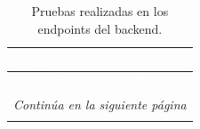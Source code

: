\begin{longtable}{|p{5cm}|p{9cm}|}
    \caption{Pruebas realizadas en los endpoints del backend.} \label{tab:pruebas_route_handlers}                                                    \\

    \hline
    \rowcolor[HTML]{E6B8CE}
    \textbf{\textcolor{white}{Endpoint}}                  & \textbf{\textcolor{white}{Test}}                                                         \\ \hline
    \endfirsthead

    \hline
    \rowcolor[HTML]{E6B8CE}
    \textbf{\textcolor{white}{Endpoint}}                  & \textbf{\textcolor{white}{Test}}                                                         \\ \hline
    \endhead

    \hline \multicolumn{2}{|r|}{\textit{Continúa en la siguiente página}}                                                                            \\ \hline
    \endfoot

    \hline
    \endlastfoot


\end{longtable}
